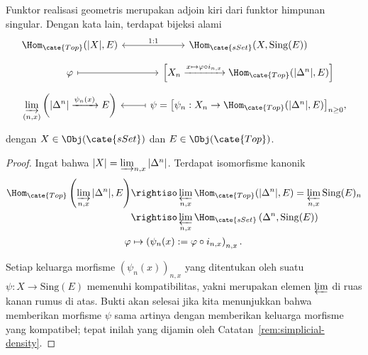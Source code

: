 \begin{theorem}\label{prop:geom-Sing-adjunction}
	Funktor realisasi geometris merupakan adjoin kiri dari funktor himpunan singular.
	Dengan kata lain, terdapat bijeksi alami
	\[\begin{tikzcd}[row sep=tiny]
		\Hom_{\cate{Top}}(|X|, E) \arrow[leftrightarrow, r, "1:1"] & \Hom_{\cate{sSet}}(X, \mathrm{Sing}(E)) \\
		\varphi \arrow[mapsto, r] & {\left[ X_n \xrightarrow{x \mapsto \varphi \circ i_{n, x}} \Hom_{\cate{Top}}(|\Delta^n|, E) \right]} \\
		\displaystyle\varinjlim_{(n, x)} \left( |\Delta^n| \xrightarrow{\psi_n(x)} E \right) & \psi = {\left[ \psi_n: X_n \to \Hom_{\cate{Top}}(|\Delta^n|, E) \right]}_{n \geq 0} , \arrow[mapsto, l]
	\end{tikzcd}\]
	dengan $X\in\Obj(\cate{sSet})$ dan $E\in\Obj(\cate{Top})$.
\end{theorem}
\begin{proof}
	Ingat bahwa $|X|=\varinjlim_{n,x}|\Delta^n|$. Terdapat isomorfisme
	kanonik
	\begin{align*}
		\Hom_{\cate{Top}}\left( \varinjlim_{n, x} |\Delta^n| , E \right) & \rightiso \varprojlim_{n, x} \Hom_{\cate{Top}}(|\Delta^n|, E) = \varprojlim_{n, x} \mathrm{Sing}(E)_n \\
		& \rightiso \varprojlim_{n, x} \Hom_{\cate{sSet}}\left( \Delta^n, \mathrm{Sing}(E) \right) \\
		\varphi & \mapsto \left( \psi_n(x) := \varphi \circ i_{n, x} \right)_{n, x}.
	\end{align*}

	Setiap keluarga morfisme $(\psi_n(x))_{n,x}$ yang ditentukan oleh suatu
	$\psi:X\to\mathrm{Sing}(E)$ memenuhi kompatibilitas, yakni merupakan
	elemen $\varprojlim$ di ruas kanan rumus di atas. Bukti akan selesai jika
	kita menunjukkan bahwa memberikan morfisme $\psi$ sama artinya dengan memberikan
	keluarga morfisme yang kompatibel; tepat inilah yang dijamin oleh
	Catatan~\ref{rem:simplicial-density}.
\end{proof}

